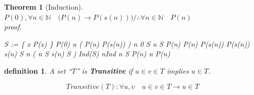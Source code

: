 \documentclass[10pt,a4paper]{book}
\newtheorem{definition}{definition}[section]
\newtheorem{theorem}{Theorem}[section]
\begin{document}
\begin{theorem}[Induction]
    $P(0) , \forall n \in \mathbb{N} \quad \Big( P(n) \to P(s(n)) \Big) /\therefore \forall n\in \mathbb{N} \quad P(n)$
    \\
    proof.

    \begin{fitchproof}[arrayenv=tabular]
         { S := \{ x \in {} \mid P(x) \}  }              
         { P(0)  }     
         {\forall n \in {} \quad \Big( P(n) \to P(s(n)) \Big)}      
        \open
         {n\in {} }                                   
         { 0 \in S }                                             
        \open
         {n \in S  }      
         { P(n) }                       
         { P(n) \to P(s(n)) }      
         { P(s(n)) }                              
         { s(n) \in S  }      
        \close
         {\forall n  \Big( n \in S  \to s(n) \in S  \Big)}      
         {Ind(S) }                                                 
         {n\in \bigcap Ind }                                        
         { n \in S }                                                
         { P(n) }                                                   
        \close
         {\forall n\in {} \quad P(n) }     

        \close

    \end{fitchproof}
\end{theorem}

\begin{definition}
    A set ``$T$'' is  \textbf{Transitive} if $u \in v \in T$ implies $ u \in T$.

    \[
        Transitive(T) : \forall u,v \quad  u \in v \in T \to u \in T
    \]
\end{definition}
\end{document}
